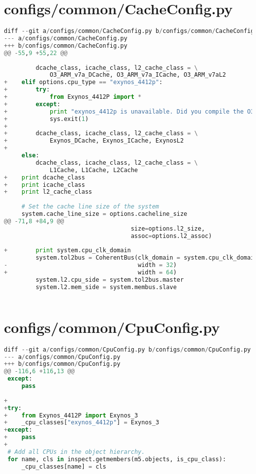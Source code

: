 \section{configs/common/CacheConfig.py}
\begin{lstlisting}[language=python]
diff --git a/configs/common/CacheConfig.py b/configs/common/CacheConfig.py
--- a/configs/common/CacheConfig.py
+++ b/configs/common/CacheConfig.py
@@ -55,9 +55,22 @@
 
         dcache_class, icache_class, l2_cache_class = \
             O3_ARM_v7a_DCache, O3_ARM_v7a_ICache, O3_ARM_v7aL2
+    elif options.cpu_type == "exynos_4412p":
+        try:
+            from Exynos_4412P import *
+        except:
+            print "exynos_4412p is unavailable. Did you compile the O3 model?"
+            sys.exit(1)
+
+        dcache_class, icache_class, l2_cache_class = \
+            Exynos_DCache, Exynos_ICache, ExynosL2
+
     else:
         dcache_class, icache_class, l2_cache_class = \
             L1Cache, L1Cache, L2Cache
+    print dcache_class
+    print icache_class
+    print l2_cache_class
 
     # Set the cache line size of the system
     system.cache_line_size = options.cacheline_size
@@ -71,8 +84,9 @@
                                    size=options.l2_size,
                                    assoc=options.l2_assoc)
 
+        print system.cpu_clk_domain
         system.tol2bus = CoherentBus(clk_domain = system.cpu_clk_domain,
-                                     width = 32)
+                                     width = 64)
         system.l2.cpu_side = system.tol2bus.master
         system.l2.mem_side = system.membus.slave
 
\end{lstlisting}
\vfill

\section{configs/common/CpuConfig.py}
\begin{lstlisting}[language=python]
diff --git a/configs/common/CpuConfig.py b/configs/common/CpuConfig.py
--- a/configs/common/CpuConfig.py
+++ b/configs/common/CpuConfig.py
@@ -116,6 +116,13 @@
 except:
     pass
 
+
+try:
+    from Exynos_4412P import Exynos_3
+    _cpu_classes["exynos_4412p"] = Exynos_3
+except:
+    pass
+
 # Add all CPUs in the object hierarchy.
 for name, cls in inspect.getmembers(m5.objects, is_cpu_class):
     _cpu_classes[name] = cls
\end{lstlisting}
\vfill


